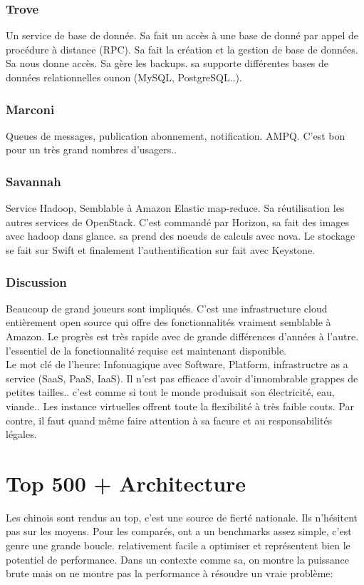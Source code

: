 \documentclass[oneside]{book}
\begin{document}
\subsection{Trove}
Un service de base de donnée. Sa fait un accès à une base de donné par appel de procédure à distance (RPC). Sa fait la création et la gestion de base de données. Sa nous donne accès. Sa gère les backups. sa supporte différentes bases de données relationnelles ounon (MySQL, PostgreSQL..). 
\subsection{Marconi}
Queues de messages, publication abonnement, notification. AMPQ. C'est bon pour un très grand nombres d'usagers..
\subsection{Savannah}
Service Hadoop, Semblable à Amazon Elastic map-reduce. Sa réutilisation les autres services de OpenStack. C'est commandé par Horizon, sa fait des images avec hadoop dans glance. sa prend des noeuds de calculs avec nova. Le stockage se fait sur Swift et finalement l'authentification sur fait avec Keystone.

\subsection{Discussion}
Beaucoup de grand joueurs sont impliqués. C'est une infrastructure cloud entièrement open source qui offre des fonctionnalités vraiment semblable à Amazon. Le progrès est très rapide avec de grande différences d'années à l'autre. l'essentiel de la fonctionnalité requise est maintenant disponible.\\

Le mot clé de l'heure: Infonuagique avec Software, Platform, infrastructre as a service (SaaS, PaaS, IaaS). Il n'est pas efficace d'avoir d'innombrable grappes de petites tailles.. c'est comme si tout le monde produisait son électricité, eau, viande.. Les instance virtuelles offrent toute la flexibilité à très faible couts. Par contre, il faut quand même faire attention à sa facure et au responsabilités légales.

\chapter{Top 500 + Architecture}
Les chinois sont rendus au top, c'est une source de fierté nationale. Ils n'hésitent pas sur les moyens. Pour les comparés, ont a un benchmarks assez simple, c'est genre une grande boucle. relativement facile a optimiser et représentent bien le potentiel de performance. Dans un contexte comme sa, on montre la puissance brute mais on ne montre pas la performance à résoudre un vraie problème:\\
\end{document}
